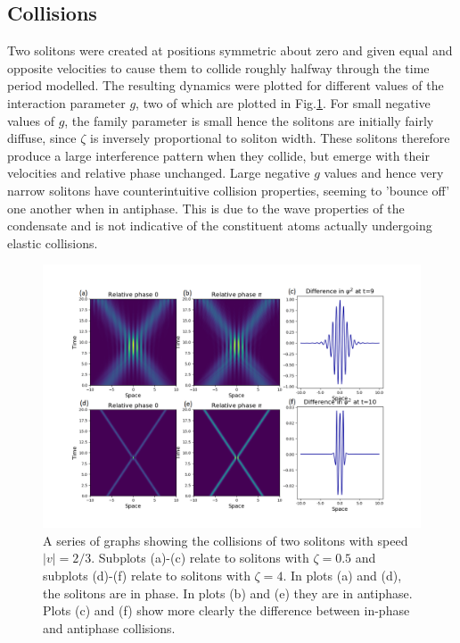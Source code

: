 \documentclass[10pt, twocolumn]{revtex4}    %
\begin{document}

\subsection{Collisions}

Two solitons were created at positions symmetric about zero and given equal and opposite velocities to cause them to collide roughly halfway through the time period modelled. The resulting dynamics were plotted for different values of the interaction parameter $g$, two of which are plotted in Fig.\ref{collision}. For small negative values of $g$, the family parameter is small hence the solitons are initially fairly diffuse, since $\zeta$ is inversely proportional to soliton width. These solitons therefore produce a large interference pattern when they collide, but emerge with their velocities and relative phase unchanged. Large negative $g$ values and hence very narrow solitons have counterintuitive collision properties, seeming to 'bounce off' one another when in antiphase. This is due to the wave properties of the condensate and is not indicative of the constituent atoms actually undergoing elastic collisions. 

\begin{figure}
\includegraphics[width=\textwidth]{extensionpic.png}
\caption{A series of graphs showing the collisions of two solitons with speed $|v|=2/3$. Subplots (a)-(c) relate to solitons with $\zeta=0.5$ and subplots (d)-(f) relate to solitons with $\zeta=4$. In plots (a) and (d), the solitons are in phase. In plots (b) and (e) they are in antiphase. Plots (c) and (f) show more clearly the difference between in-phase and antiphase collisions.}
\label{collision}
\end{figure}
\end{document}
